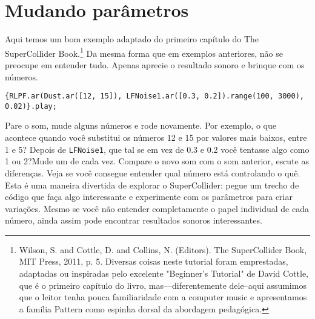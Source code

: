 \section{Mudando parâmetros}

Aqui temos um bom exemplo adaptado do primeiro capítulo do The SuperCollider Book.\footnote{
Wilson, S. and Cottle, D. and Collins, N. (Editors). The SuperCollider Book, MIT Press, 2011, p. 5. Diversas coisas neste tutorial foram emprestadas, adaptadas ou inspiradas pelo excelente "Beginner’s Tutorial" de David Cottle, que é o primeiro capítulo do livro, mas---diferentemente dele--aqui assumimos que o leitor tenha pouca familiaridade com a computer music e apresentamos a família Pattern como espinha dorsal da abordagem pedagógica.
} Da mesma forma que em exemplos anteriores, não se preocupe em entender tudo. Apenas aprecie o resultado sonoro e brinque com os números.


\begin{lstlisting}[style=SuperCollider-IDE, basicstyle=\scttfamily\footnotesize]
{RLPF.ar(Dust.ar([12, 15]), LFNoise1.ar([0.3, 0.2]).range(100, 3000), 0.02)}.play;
\end{lstlisting}

Pare o som, mude alguns números e rode novamente. Por exemplo, o que acontece quando você substitui os números 12 e 15 por valores mais baixos, entre 1 e 5? Depois de \texttt{LFNoise1}, que tal se em vez de 0.3 e 0.2 você tentasse algo como 1 ou 2?Mude um de cada vez. Compare o novo som com o som anterior, escute as diferenças. Veja se você consegue entender qual número está controlando o quê. Esta é uma maneira divertida de explorar o SuperCollider: pegue um trecho de código que faça algo interessante e experimente com os parâmetros para criar variações. Mesmo se você não entender completamente o papel individual de cada número, ainda assim pode encontrar resultados sonoros interessantes.

\bigskip 
{}
